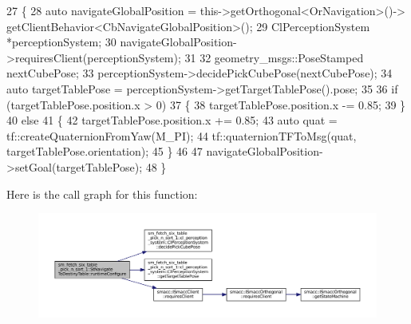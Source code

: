 \begin{DoxyCode}
27         \{
28             \textcolor{keyword}{auto} navigateGlobalPosition = this->getOrthogonal<OrNavigation>()->
      getClientBehavior<CbNavigateGlobalPosition>();
29             ClPerceptionSystem *perceptionSystem;
30             navigateGlobalPosition->requiresClient(perceptionSystem);
31 
32             geometry\_msgs::PoseStamped nextCubePose;
33             perceptionSystem->decidePickCubePose(nextCubePose);
34             \textcolor{keyword}{auto} targetTablePose = perceptionSystem->getTargetTablePose().pose;
35 
36             \textcolor{keywordflow}{if} (targetTablePose.position.x > 0)
37             \{
38                 targetTablePose.position.x -= 0.85;   
39             \}
40             \textcolor{keywordflow}{else}
41             \{
42                 targetTablePose.position.x += 0.85;
43                 \textcolor{keyword}{auto} quat = tf::createQuaternionFromYaw(M\_PI);
44                 tf::quaternionTFToMsg(quat, targetTablePose.orientation);
45             \}
46 
47             navigateGlobalPosition->setGoal(targetTablePose);
48         \}
\end{DoxyCode}
Here is the call graph for this function\+:
\nopagebreak
\begin{figure}[H]
\begin{center}
\leavevmode
\includegraphics[width=350pt]{structsm__fetch__six__table__pick__n__sort__1_1_1StNavigateToDestinyTable_a9243186869228196101ca60180b9b1b1_cgraph}
\end{center}
\end{figure}
\mbox{\label{structsm__fetch__six__table__pick__n__sort__1_1_1StNavigateToDestinyTable_ae38532760f97b528f03df3f4b540da1a}} 
